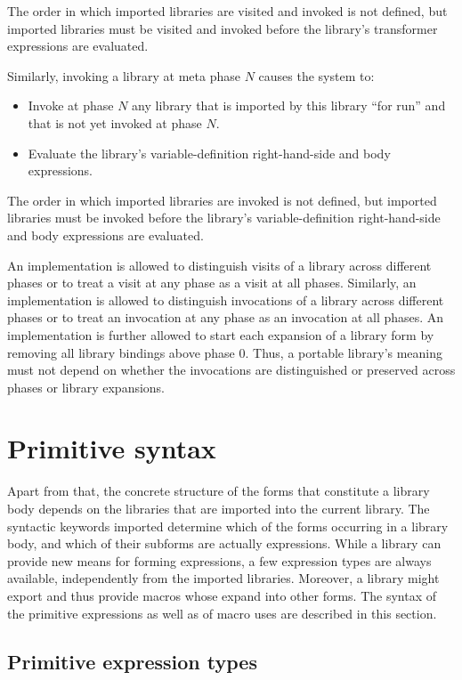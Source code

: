 The order in which imported libraries are visited and invoked is not
defined, but imported libraries must be visited and invoked before the
library's transformer expressions are evaluated.

Similarly, invoking a library at meta phase $N$ causes the system to:

\begin{itemize}
\item Invoke at phase $N$ any library that is imported by this library
      ``for {\cf run}'' and that is not yet invoked at phase $N$.
\item Evaluate the library's variable-definition right-hand-side and body
      expressions.
\end{itemize}

The order in which imported libraries are invoked is not defined, but
imported libraries must be invoked before the library's variable-definition
right-hand-side and body expressions are evaluated.

An implementation is allowed to distinguish visits of a library across
different phases or to treat a visit at any phase as a visit at all
phases.
Similarly, an implementation is allowed to distinguish invocations of a
library across different phases or to treat an invocation at any phase as
an invocation at all phases.
An implementation is further allowed to start each expansion of a
{\cf library} form by removing all library bindings above phase 0.
Thus, a portable library's meaning must not depend on whether the
invocations are distinguished or preserved across phases or {\cf library}
expansions.

\section{Primitive syntax}

Apart
from that, the concrete structure of the forms that constitute a
library body depends on the libraries that are imported into
the current library.  The syntactic keywords imported determine which
of the forms occurring in a library body, and which of their
subforms are actually expressions.  While a library can
provide new means for forming expressions, a few expression types are
always available, independently from the imported libraries.
Moreover, a library might export and thus provide macros whose expand
into other forms. The syntax of the primitive expressions as well as
of macro uses are described in this section.

\subsection{Primitive expression types}
\label{primitiveexpressionsection}

